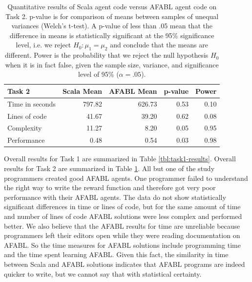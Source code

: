 \begin{center}
\begin{table}[h]
\begin{center}

\begin{tabular}{|l|r|r|r|r|}\hline
Task 2 & Scala Mean & AFABL Mean & p-value & Power \\\hline
Time in seconds & 797.82 & 626.73 & 0.53 & 0.10\\
Lines of code & 41.67 & 39.20 & 0.62 & 0.08\\
Complexity & 11.27 & 8.20 & 0.05 & 0.95\\
Performance & 0.48 & 0.54 & 0.03 & 0.98\\
\hline
\end{tabular}

\end{center}
\caption{Quantitative results of Scala agent code versus AFABL agent code on Task 2. p-value is for comparison of means between samples of unequal variances (Welch's t-test). A p-value of less than .05 mean that the difference in means is statistically significant at the 95\% significance level, i.e. we reject $H_0: \mu_1 = \mu_2$ and conclude that the means are different. Power is the probability that we reject the null hypothesis $H_0$ when it is in fact false, given the sample size, variance, and significance level of 95\% ($\alpha = .05$).}
\label{tbl:task2-results}
\end{table}
\end{center}


Overall results for Task 1 are summarized in Table \ref{tbl:task1-results}. Overall results for Task 2 are summarized in Table \ref{tbl:task2-results}. All but one of the study programmers created good AFABL agents. One programmer failed to understand the right way to write the reward function and therefore got very poor performance with their AFABL agents. The data do not show statistically significant differences in time or lines of code, but for the same amount of time and number of lines of code AFABL solutions were less complex and performed better. We also believe that the AFABL results for time are unreliable because programmers left their editors open while they were reading documentation on AFABL. So the time measures for AFABL solutions include programming time and the time spent learning AFABL. Given this fact, the similarity in time between Scala and AFABL solutions indicates that AFABL programs are indeed quicker to write, but we cannot say that with statistical certainty.

